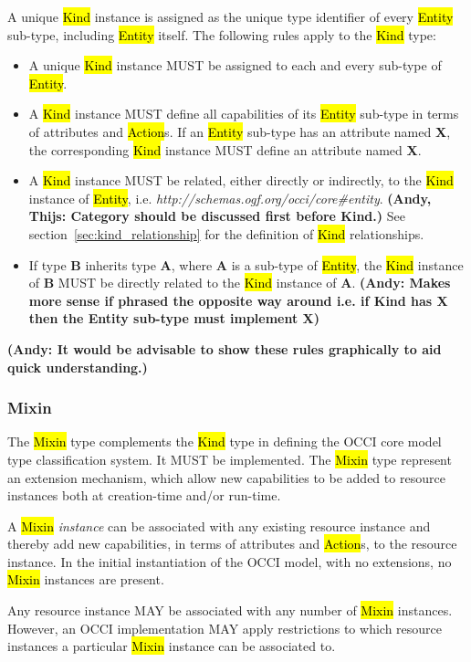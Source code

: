 \documentclass[10pt,a4paper]{article}
\begin{document}
A unique \hl{Kind} instance is assigned as the unique type identifier of every
\hl{Entity} sub-type, including \hl{Entity} itself. The following rules apply
to the \hl{Kind} type:
\begin{itemize}
\item A unique \hl{Kind} instance MUST be assigned to each and every sub-type
 of \hl{Entity}.
\item A \hl{Kind} instance MUST define all capabilities of its \hl{Entity}
 sub-type in terms of attributes and \hl{Action}s. If an \hl{Entity} sub-type
 has an attribute named {\bf X}, the corresponding \hl{Kind} instance MUST define
 an attribute named {\bf X}.
\item A \hl{Kind} instance MUST be related, either directly or indirectly, to
 the \hl{Kind} instance of \hl{Entity},
 i.e. \textit{http://schemas.ogf.org/occi/core\#entity}.
\textbf{(Andy, Thijs: Category should be discussed first before Kind.)} 
See section~\ref{sec:kind_relationship} for the definition of \hl{Kind}
 relationships.
\item If type {\bf B} inherits type {\bf A}, where {\bf A} is a sub-type of
 \hl{Entity}, the \hl{Kind} instance of {\bf B} MUST be directly related to the
 \hl{Kind} instance of {\bf A}. \textbf{(Andy: Makes more sense if phrased 
 the opposite way around i.e. if Kind has X then the Entity sub-type must implement X)}
\end{itemize}

\textbf{(Andy: It would be advisable to show these rules graphically to aid quick understanding.)}

\subsubsection{Mixin}
The \hl{Mixin} type complements the \hl{Kind} type in defining the
OCCI core model type classification system. It MUST be implemented. The \hl{Mixin}
type represent an extension mechanism, which allow new capabilities to
be added to resource instances both at creation-time and/or run-time.

A \hl{Mixin} {\em instance} can be associated with any existing resource
instance and thereby add new capabilities, in terms of attributes and
\hl{Action}s, to the resource instance. In the initial instantiation of the OCCI
model, with no extensions, no \hl{Mixin} instances are present.

Any resource instance MAY be associated with any number of \hl{Mixin}
instances.  However, an OCCI implementation MAY apply restrictions to which
resource instances a particular \hl{Mixin} instance can be associated to.
\end{document}
